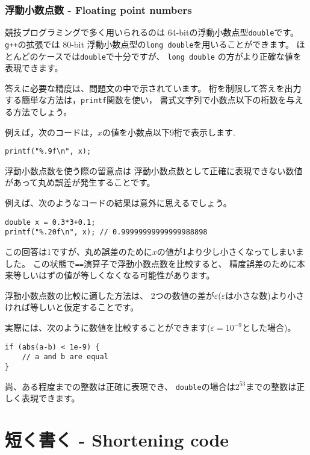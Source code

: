 \subsubsection{浮動小数点数 - Floating point numbers}


競技プログラミングで多く用いられるのは
64-bitの浮動小数点型\texttt{double}です。
\texttt{g++}の拡張では
80-bit 浮動小数点型の\texttt{long double}を用いることができます。
ほとんどのケースでは\texttt{double}で十分ですが、
\texttt{long double} の方がより正確な値を表現できます。

答えに必要な精度は、問題文の中で示されています。
桁を制限して答えを出力する簡単な方法は，\texttt{printf}関数を使い，
書式文字列で小数点以下の桁数を与える方法でしょう。

例えば，次のコードは，$x$の値を小数点以下9桁で表示します.
\begin{lstlisting}
printf("%.9f\n", x);
\end{lstlisting}

浮動小数点数を使う際の留意点は
浮動小数点数として正確に表現できない数値があって丸め誤差が発生することです。

例えば、次のようなコードの結果は意外に思えるでしょう。
\begin{lstlisting}
double x = 0.3*3+0.1;
printf("%.20f\n", x); // 0.99999999999999988898
\end{lstlisting}

この回答は1ですが、丸め誤差のために$x$の値が1より少し小さくなってしまいました。
この状態で\texttt{==}演算子で浮動小数点数を比較すると、
精度誤差のために本来等しいはずの値が等しくなくなる可能性があります。

浮動小数点数の比較に適した方法は、
2つの数値の差が$\varepsilon$($\varepsilon$は小さな数)より小さければ等しいと仮定することです。

実際には、次のように数値を比較することができます($\varepsilon=10^{-9}$とした場合)。
\begin{lstlisting}
if (abs(a-b) < 1e-9) {
    // a and b are equal
}
\end{lstlisting}

尚、ある程度までの整数は正確に表現でき、
\texttt{double}の場合は$2^{53}$までの整数は正しく表現できます。

\section{短く書く - Shortening code}

